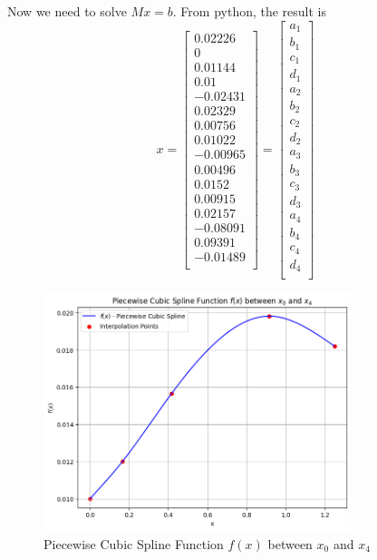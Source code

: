 \documentclass{article}
\begin{document}
Now we need to solve \( Mx = b \). From python, the result is
\[
    x = \begin{bmatrix}
        0.02226  \\
        0        \\
        0.01144  \\
        0.01     \\
        -0.02431 \\
        0.02329  \\
        0.00756  \\
        0.01022  \\
        -0.00965 \\
        0.00496  \\
        0.0152   \\
        0.00915  \\
        0.02157  \\
        -0.08091 \\
        0.09391  \\
        -0.01489 \\
    \end{bmatrix}
    = \begin{bmatrix}
        a_1 \\
        b_1 \\
        c_1 \\
        d_1 \\
        a_2 \\
        b_2 \\
        c_2 \\
        d_2 \\
        a_3 \\
        b_3 \\
        c_3 \\
        d_3 \\
        a_4 \\
        b_4 \\
        c_4 \\
        d_4 \\
    \end{bmatrix}
\]
\begin{figure}[h]
    \centering
    \includegraphics[width=0.8\textwidth]{output.png}
    \caption{Piecewise Cubic Spline Function \( f(x) \) between \( x_0 \) and \( x_4 \)}
    \label{fig:spline_plot}
\end{figure}
\end{document}
